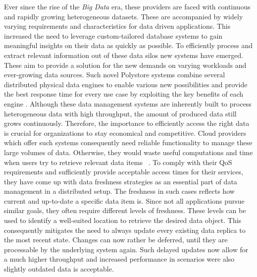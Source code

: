 Ever since the rise of the \emph{Big Data} era, these providers are faced with continuous
and rapidly growing heterogeneous datasets. These are accompanied by widely varying requirements 
and characteristics for data driven applications. This increased the need to leverage custom-tailored 
database systems to gain meaningful insights on their data as quickly as possible.
To efficiently process and extract relevant information out of these data silos new systems
have emerged. These aim to provide a solution for the new demands on varying workloads 
and ever-growing data sources.
Such novel Polystore systems combine several distributed physical data engines to enable various
new possibilities and provide the best response time for every use case by exploiting
the key benefits of each engine \cite{stonebraker:2005} \cite{polypheny2020}. Although these data management systems are inherently
built to process heterogeneous data with high throughput, the amount of produced data
still grows continuously.
Therefore, the importance to efficiently access the right data is crucial
for organizations to stay economical and competitive. Cloud providers which offer such systems consequently 
need reliable functionality to manage these large volumes of data. Otherwise, they would waste useful 
computations and time when users try to retrieve relevant data items ~\cite{levandowski2013}.
To comply with their QoS requirements and sufficiently provide acceptable access times for their services, 
they have come up with data freshness strategies as an essential part of data management in a
distributed setup. 
The freshness in such cases reflects how current and up-to-date a specific data item is.
Since not all applications pursue similar goals, they often require different levels of freshness.
These levels can be used to identify a well-suited location to retrieve the desired data object. 
This consequently mitigates the need to always update every existing data replica to the most recent state.
Changes can now rather be deferred, until they are processable by the underlying system again.
Such delayed updates now allow for a much higher throughput and increased performance in scenarios were also slightly 
outdated data is acceptable.




